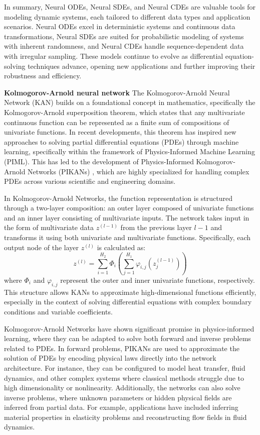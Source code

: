 In summary, Neural ODEs, Neural SDEs, and Neural CDEs are valuable tools for modeling dynamic systems, each tailored to different data types and application scenarios. Neural ODEs excel in deterministic systems and continuous data transformations, Neural SDEs are suited for probabilistic modeling of systems with inherent randomness, and Neural CDEs handle sequence-dependent data with irregular sampling. These models continue to evolve as differential equation-solving techniques advance, opening new applications and further improving their robustness and efficiency.

\textbf{Kolmogorov-Arnold neural network}
The Kolmogorov-Arnold Neural Network (KAN) builds on a foundational concept in mathematics, specifically the Kolmogorov-Arnold superposition theorem, which states that any multivariate continuous function can be represented as a finite sum of compositions of univariate functions. In recent developments, this theorem has inspired new approaches to solving partial differential equations (PDEs) through machine learning, specifically within the framework of Physics-Informed Machine Learning (PIML). This has led to the development of Physics-Informed Kolmogorov-Arnold Networks (PIKANs) \cite{wang2024kolmogorov}, which are highly specialized for handling complex PDEs across various scientific and engineering domains.

In Kolmogorov-Arnold Networks, the function representation is structured through a two-layer composition: an outer layer composed of univariate functions and an inner layer consisting of multivariate inputs. The network takes input in the form of multivariate data \( z^{(l-1)} \) from the previous layer \( l-1 \) and transforms it using both univariate and multivariate functions. Specifically, each output node of the layer \( z^{(l)} \) is calculated as:
\[
z^{(l)} = \sum_{i=1}^{H_{2}} \Phi_i \left( \sum_{j=1}^{H_{1}} \varphi_{i,j}(z^{(l-1)}_j) \right)
\]
where \( \Phi_i \) and \( \varphi_{i,j} \) represent the outer and inner univariate functions, respectively. This structure allows KANs to approximate high-dimensional functions efficiently, especially in the context of solving differential equations with complex boundary conditions and variable coefficients.

Kolmogorov-Arnold Networks have shown significant promise in physics-informed learning, where they can be adapted to solve both forward and inverse problems related to PDEs. In forward problems, PIKANs are used to approximate the solution of PDEs by encoding physical laws directly into the network architecture. For instance, they can be configured to model heat transfer, fluid dynamics, and other complex systems where classical methods struggle due to high dimensionality or nonlinearity. Additionally, the networks can also solve inverse problems, where unknown parameters or hidden physical fields are inferred from partial data. For example, applications have included inferring material properties in elasticity problems and reconstructing flow fields in fluid dynamics.

